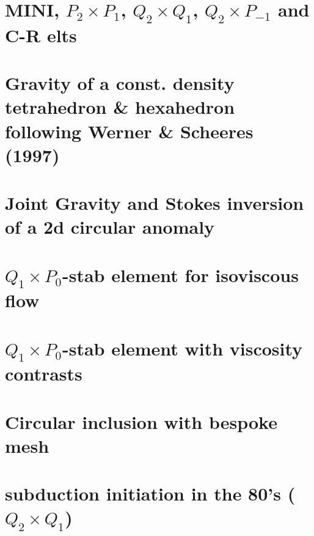 \documentclass[a4paper,11pt]{report}
\begin{document}
\chapter{MINI, $P_2\times P_1$,  $Q_2\times Q_1$, $Q_2\times P_{-1}$ and C-R elts\label{f112}} %

\chapter{Gravity of a const. density tetrahedron \& hexahedron following Werner \& Scheeres (1997) \label{f113}} %

\chapter{Joint Gravity and Stokes inversion of a 2d circular anomaly \label{f114}} %

\chapter{$Q_1\times P_0$-stab element for isoviscous flow \label{f115}} %

\chapter{$Q_1\times P_0$-stab element with viscosity contrasts\label{f116}} %

\chapter{Circular inclusion with bespoke mesh \label{f117}} %

\chapter{subduction initiation in the 80's ($Q_2\times Q_1$) \label{f118}} %
\end{document}

